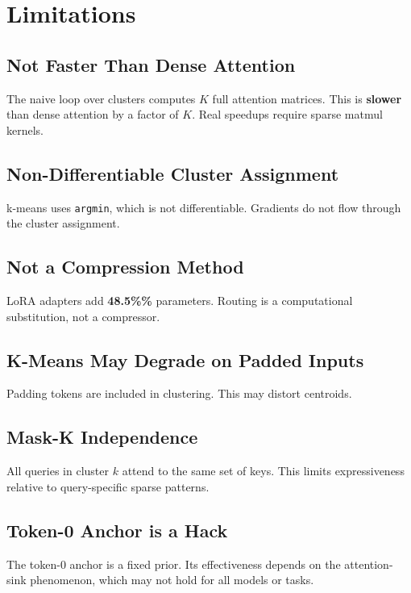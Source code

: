 
\section{Limitations}

\subsection{Not Faster Than Dense Attention}

The naive loop over clusters computes $K$ full attention matrices. This is 
\textbf{slower} than dense attention by a factor of $K$. Real speedups require 
sparse matmul kernels.

\subsection{Non-Differentiable Cluster Assignment}

k-means uses \texttt{argmin}, which is not differentiable. Gradients do not flow 
through the cluster assignment.

\subsection{Not a Compression Method}

LoRA adapters add \textbf{48.5\%\%} parameters. Routing is a computational 
substitution, not a compressor.

\subsection{K-Means May Degrade on Padded Inputs}

Padding tokens are included in clustering. This may distort centroids.

\subsection{Mask-K Independence}

All queries in cluster $k$ attend to the same set of keys. This limits 
expressiveness relative to query-specific sparse patterns.

\subsection{Token-0 Anchor is a Hack}

The token-0 anchor is a fixed prior. Its effectiveness depends on the 
attention-sink phenomenon, which may not hold for all models or tasks.


